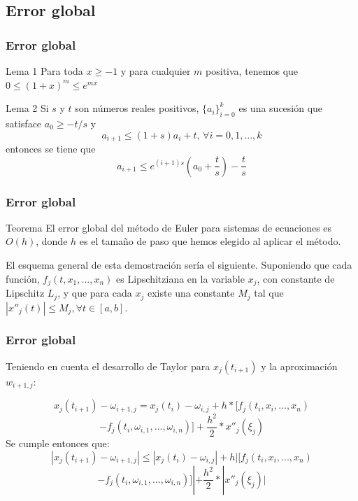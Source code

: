 \documentclass{beamer}
\begin{document}
\subsection{Error global}
\begin{frame}
	\frametitle{Error global}
	
	\begin{block}{Lema 1}
		Para toda $x \geq -1$ y para cualquier $m$ positiva, tenemos que $0 \leq (1 + x)^m \leq e^{mx}$
	\end{block}
	
	
	\begin{block}{Lema 2}
		Si $s$ y $t$ son números reales positivos, $\{a_i\}^k_{i=0}$ es una sucesión que satisface $ a_0 \geq -t/s$ y
		$$a_{i+1} \leq (1+s)a_i + t, \, \forall i=0, 1, ..., k$$
		entonces se tiene que
		$$a_{i+1} \leq e^{(i+1)s}\left( a_0 + \frac{t}{s}\right) - \frac{t}{s}$$
	\end{block}
	
	
	
\end{frame}

\begin{frame}
	\frametitle{Error global}
	\begin{block}{Teorema}
		El error global del método de Euler para sistemas de ecuaciones es $O(h)$, donde $h$ es el tamaño de paso que hemos elegido al aplicar el método. 
	\end{block}
	
	El esquema general de esta demostración sería el siguiente. Suponiendo que cada función, $f_j(t, x_1, ..., x_n)$ es Lipschitziana en la variable $x_j$, con constante de Lipschitz $L_j$, y que para cada $x_j$ existe una constante $M_j$ tal que $| x''_j(t) | \leq M_j, \forall t \in [a,b]$.\\
	
	
\end{frame}

\begin{frame}
	\frametitle{Error global}

	Teniendo en cuenta el desarrollo de Taylor para $x_j(t_{i+1})$ y la aproximación $w_{i+1,j}$:
	
	$$
	x_j(t_{i+1}) - \omega_{i+1,j} = x_j(t_i) - \omega_{i,j} + h*[f_j(t_i, x_i, ..., x_n) $$
	$$- f_j(t_i, \omega_{i,1}, ..., \omega_{i,n})] + \frac{h^2}{2}*x''_j(\xi_j) $$
	Se cumple entonces que:
	$$ | x_j(t_{i+1}) - \omega_{i+1,j} | \leq | x_j(t_i) - \omega_{i,j} | + h|[f_j(t_i, x_i, ..., x_n) $$
	$$- f_j(t_i, \omega_{i,1}, ..., \omega_{i,n})]| + \frac{h^2}{2}*|x''_j(\xi_j)| $$
	
\end{frame}
\end{document}
